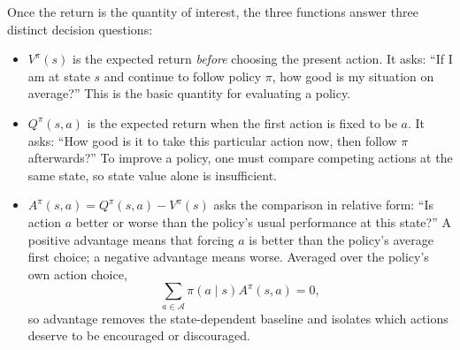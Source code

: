 \documentclass[11pt,a4paper]{article}
\theoremstyle{definition}
\begin{document}
\begin{note}
Once the return is the quantity of interest, the three functions answer three distinct
decision questions:
\begin{itemize}
    \item $V^\pi(s)$ is the expected return \emph{before} choosing the present action. It asks:
    ``If I am at state $s$ and continue to follow policy $\pi$, how good is my situation on
    average?'' This is the basic quantity for evaluating a policy.

    \item $Q^\pi(s,a)$ is the expected return when the first action is fixed to be $a$. It
    asks: ``How good is it to take this particular action now, then follow $\pi$ afterwards?''
    To improve a policy, one must compare competing actions at the same state, so state value
    alone is insufficient.

    \item $A^\pi(s,a)=Q^\pi(s,a)-V^\pi(s)$ asks the comparison in relative form: ``Is action
    $a$ better or worse than the policy's usual performance at this state?'' A positive
    advantage means that forcing $a$ is better than the policy's average first choice; a
    negative advantage means worse. Averaged over the policy's own action choice,
    \[
    \sum_{a\in\mathcal{A}}\pi(a\mid s)A^\pi(s,a)=0,
    \]
    so advantage removes the state-dependent baseline and isolates which actions deserve to
    be encouraged or discouraged.
\end{itemize}
\end{note}
\end{document}
